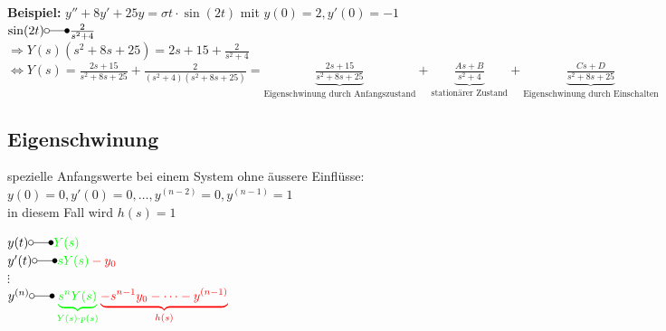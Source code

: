 		\begin{minipage}[l]{16cm}
				\textbf{Beispiel:} $y'' + 8y' + 25y = \sigma{t} \cdot \sin(2t)$ mit $y(0) = 2, y'(0) = -1$\\
				
				$\sin(2t) \laplace \frac{2}{s^2+4}$ \\
				
				$\Rightarrow Y(s)(s^2+8s+25) = 2s+15+\frac{2}{s^2+4}$\\
				
				$\Leftrightarrow Y(s) = \frac{2s+15}{s^2+8s+25}+\frac{2}{(s^2+4)(s^2+8s+25)}=
				\underbrace{\frac{2s+15}{s^2+8s+25}}_\text{Eigenschwinung durch Anfangszustand} +
				\underbrace{\frac{As + B}{s^2+4}}_\text{stationärer Zustand} +
				\underbrace{\frac{Cs + D}{s^2+8s+25}}_\text{Eigenschwinung durch Einschalten}$
		\end{minipage}

	\subsection{Eigenschwinung}
		\begin{minipage}{12cm}
			spezielle Anfangswerte bei einem System ohne äussere Einflüsse:\\
			$y(0) = 0, y'(0) = 0, \dots , y^{(n-2)} = 0, y^{(n-1)} = 1$\\
			in diesem Fall wird $h(s) = 1$\\
		\end{minipage}
		\begin{minipage}{6cm}
			$y(t) \laplace \color{green} Y(s)$\\
			$y'(t) \laplace \color{green} sY(s)\color{red} - y_0$\\
			$\vdots$\\
			$y^{(n)} \laplace 
			\color{green}\underbrace{s^nY(s)}_{Y(s) \cdot p(s)}
			\color{red}\underbrace{-s^{n-1}y_0 - \dots - y^{(n-1)}}_{h(s)}$
		\end{minipage}